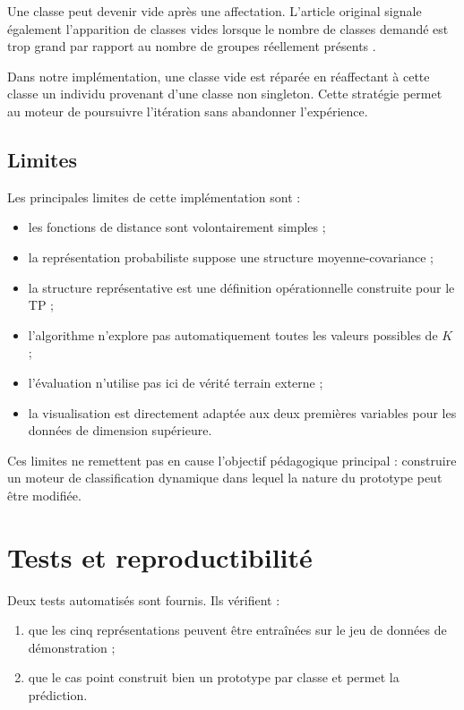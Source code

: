 \documentclass[12pt,a4paper]{article}
\begin{document}
Une classe peut devenir vide après une affectation. L'article original signale également l'apparition de classes vides lorsque le nombre de classes demandé est trop grand par rapport au nombre de groupes réellement présents \cite[p.~25]{diday1971}.

Dans notre implémentation, une classe vide est réparée en réaffectant à cette classe un individu provenant d'une classe non singleton. Cette stratégie permet au moteur de poursuivre l'itération sans abandonner l'expérience.

\subsection{Limites}

Les principales limites de cette implémentation sont :
\begin{itemize}
    \item les fonctions de distance sont volontairement simples ;
    \item la représentation probabiliste suppose une structure moyenne-covariance ;
    \item la structure représentative est une définition opérationnelle construite pour le TP ;
    \item l'algorithme n'explore pas automatiquement toutes les valeurs possibles de $K$ ;
    \item l'évaluation n'utilise pas ici de vérité terrain externe ;
    \item la visualisation est directement adaptée aux deux premières variables pour les données de dimension supérieure.
\end{itemize}

Ces limites ne remettent pas en cause l'objectif pédagogique principal : construire un moteur de classification dynamique dans lequel la nature du prototype peut être modifiée.

\section{Tests et reproductibilité}

Deux tests automatisés sont fournis. Ils vérifient :
\begin{enumerate}
    \item que les cinq représentations peuvent être entraînées sur le jeu de données de démonstration ;
    \item que le cas point construit bien un prototype par classe et permet la prédiction.
\end{enumerate}
\end{document}
